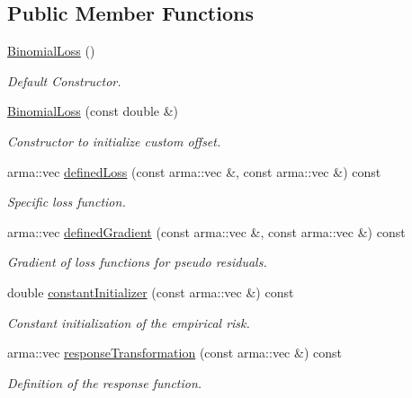 \subsection*{Public Member Functions}
\begin{DoxyCompactItemize}
\item 
\mbox{\hyperlink{classloss_1_1_binomial_loss_ab903b1364d0569c83b4f44d8c7af0f69}{Binomial\+Loss}} ()
\begin{DoxyCompactList}\small\item\em Default Constructor. \end{DoxyCompactList}\item 
\mbox{\hyperlink{classloss_1_1_binomial_loss_aac60ad4791933f54fb9858e8d89ba6a5}{Binomial\+Loss}} (const double \&)
\begin{DoxyCompactList}\small\item\em Constructor to initialize custom offset. \end{DoxyCompactList}\item 
arma\+::vec \mbox{\hyperlink{classloss_1_1_binomial_loss_aa4570a731257ba43b1b4d6099c0a4515}{defined\+Loss}} (const arma\+::vec \&, const arma\+::vec \&) const
\begin{DoxyCompactList}\small\item\em Specific loss function. \end{DoxyCompactList}\item 
arma\+::vec \mbox{\hyperlink{classloss_1_1_binomial_loss_a47a27e1be3e7f2c275046b42557ca21a}{defined\+Gradient}} (const arma\+::vec \&, const arma\+::vec \&) const
\begin{DoxyCompactList}\small\item\em Gradient of loss functions for pseudo residuals. \end{DoxyCompactList}\item 
double \mbox{\hyperlink{classloss_1_1_binomial_loss_a1292422a2b07c8ebe1b168375940b029}{constant\+Initializer}} (const arma\+::vec \&) const
\begin{DoxyCompactList}\small\item\em Constant initialization of the empirical risk. \end{DoxyCompactList}\item 
arma\+::vec \mbox{\hyperlink{classloss_1_1_binomial_loss_a6fb5f28518ac455cb192441660e7b997}{response\+Transformation}} (const arma\+::vec \&) const
\begin{DoxyCompactList}\small\item\em Definition of the response function. \end{DoxyCompactList}\end{DoxyCompactItemize}
